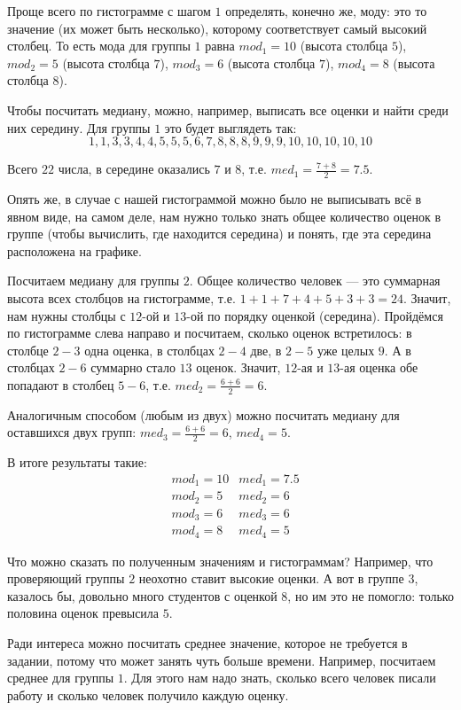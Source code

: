 \documentclass[12pt, a4paper, oneside]{article}
\theoremstyle{plain} %
\theoremstyle{definition}
\begin{document}
\begin{solution}
Проще всего по гистограмме с шагом $1$ определять, конечно же, моду: это то значение (их может быть несколько), которому соответствует самый высокий столбец. То есть мода для группы $1$ равна $mod_1 = 10$ (высота столбца $5$), $mod_2 = 5$ (высота столбца $7$), $mod_3 = 6$ (высота столбца $7$), $mod_4 = 8$ (высота столбца $8$).

Чтобы посчитать медиану, можно, например, выписать все оценки и найти среди них середину.
Для группы $1$ это будет выглядеть так:
$$
    1, 1, 3, 3, 4, 4, 5, 5, 5, 6, 7, 8, 8, 8, 9, 9, 9, 10, 10, 10, 10, 10
$$

Всего $22$ числа, в середине оказались $7$ и $8$, т.е. $med_1 = \frac{7 + 8}{2} = 7.5$.

Опять же, в случае с нашей гистограммой можно было не выписывать всё в явном виде, на самом деле, нам нужно только знать общее количество оценок в группе (чтобы вычислить, где находится середина) и понять, где эта середина расположена на графике.

Посчитаем медиану для группы $2$. Общее количество человек --- это суммарная высота всех столбцов на гистограмме, т.е. $1 + 1 + 7 + 4 + 5 + 3 + 3 = 24$. Значит, нам нужны столбцы с $12$-ой и $13$-ой по порядку оценкой (середина). Пройдёмся по гистограмме слева направо и посчитаем, сколько оценок встретилось: в столбце $2-3$ одна оценка, в столбцах $2-4$ две, в $2-5$ уже целых $9$. А в столбцах $2-6$ суммарно стало $13$ оценок. Значит, $12$-ая и $13$-ая оценка обе попадают в столбец $5-6$, т.е. $med_2 = \frac{6 + 6}{2} = 6$.

Аналогичным способом (любым из двух) можно посчитать медиану для оставшихся двух групп: $med_3 = \frac{6 + 6}{2} = 6$, $med_4 = 5$.

В итоге результаты такие:
\begin{align*}
    &mod_1 = 10 &med_1 = 7.5 \\
    &mod_2 = 5 &med_2 = 6 \\
    &mod_3 = 6 &med_3 = 6 \\
    &mod_4 = 8 &med_4 = 5
\end{align*}

Что можно сказать по полученным значениям и гистограммам? Например, что проверяющий группы $2$ неохотно ставит высокие оценки. А вот в группе $3$, казалось бы, довольно много студентов с оценкой $8$, но им это не помогло: только половина оценок превысила $5$.

Ради интереса можно посчитать среднее значение, которое не требуется в задании, потому что может занять чуть больше времени.
Например, посчитаем среднее для группы $1$. Для этого нам надо знать, сколько всего человек писали работу и сколько человек получило каждую оценку.


\end{solution}
\end{document}
